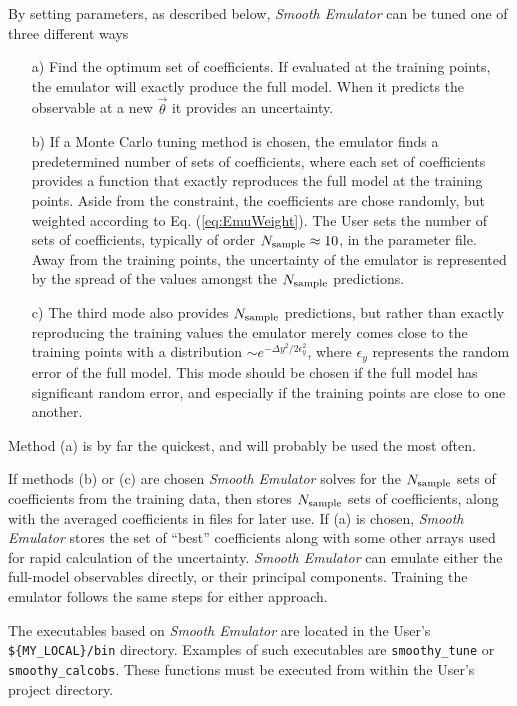 \documentclass[UserManual.tex]{subfiles}
\begin{document}
By setting parameters, as described below, {\it Smooth Emulator} can be tuned one of three different ways
\begin{itemize}\itemsep=0pt
\item[a)] Find the optimum set of coefficients. If evaluated at the training points, the emulator will exactly produce the full model. When it predicts the observable at a new $\vec{\theta}$ it provides an uncertainty.
\item[b)] If a Monte Carlo tuning method is chosen, the emulator finds a predetermined number of sets of coefficients, where each set of coefficients provides a function that exactly reproduces the full model at the training points. Aside from the constraint, the coefficients are chose randomly, but weighted according to Eq. (\ref{eq:EmuWeight}). The User sets the number of sets of coefficients, typically of order $N_{\rm sample}\approx 10$, in the parameter file. Away from the training points, the uncertainty of the emulator is represented by the spread of the values amongst the $N_{\rm sample}$ predictions.
\item[c)] The third mode also provides $N_{\rm sample}$ predictions, but rather than exactly reproducing the training values the emulator merely comes close to the training points with a distribution $\sim e^{-\Delta y^2/2\epsilon_y^2}$, where $\epsilon_y$ represents the random error of the full model. This mode should be chosen if the full model has significant random error, and especially if the training points are close to one another.
\end{itemize}
Method (a) is by far the quickest, and will probably be used the most often. 

If methods (b) or (c) are chosen {\it Smooth Emulator} solves for the $N_{\rm sample}$ sets of coefficients from the training data, then stores $N_{\rm sample}$ sets of coefficients, along with the averaged coefficients in files for later use. If (a) is chosen, {\it Smooth Emulator} stores the set of ``best'' coefficients along with some other arrays used for rapid calculation of the uncertainty. {\it Smooth Emulator} can emulate either the full-model observables directly, or their principal components. Training the emulator follows the same steps for either approach. 

The executables based on {\it Smooth Emulator} are located in the User's {\tt \$\{MY\_LOCAL\}/bin} directory. Examples of such executables are {\tt smoothy\_tune} or {\tt smoothy\_calcobs}. These functions must be executed from within the User's project directory. 
\end{document}
